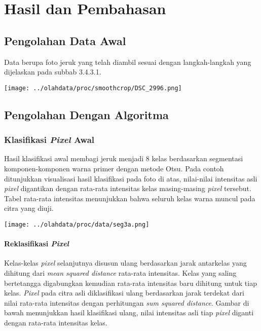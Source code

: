 \documentclass[laporan.tex]{subfiles}
\begin{document}
\chapter{Hasil dan Pembahasan}

\section{Pengolahan Data Awal}

Data berupa foto jeruk yang telah diambil sesuai dengan langkah-langkah yang dijelaskan pada subbab 3.4.3.1.

\texttt{[image: ../olahdata/proc/smoothcrop/DSC\_2996.png]}

\section{Pengolahan Dengan Algoritma}

\subsection{Klasifikasi \emph{Pixel} Awal}

Hasil klasifikasi awal membagi jeruk menjadi 8 kelas berdasarkan segmentasi komponen-komponen warna primer dengan metode Otsu. Pada contoh ditunjukkan visualisasi hasil klasifikasi pada foto di atas, nilai-nilai intensitas asli \emph{pixel} digantikan dengan rata-rata intensitas kelas masing-masing \emph{pixel} tersebut. Tabel rata-rata intensitas menunjukkan bahwa seluruh kelas warna muncul pada citra yang diuji.

\texttt{[image: ../olahdata/proc/data/seg3a.png]}

\subsubsection{Reklasifikasi \emph{Pixel}}

Kelas-kelas \emph{pixel} selanjutnya disusun ulang berdasarkan jarak antarkelas yang dihitung dari \emph{mean squared distance} rata-rata intensitas. Kelas yang saling bertetangga digabungkan kemudian rata-rata intensitas baru dihitung untuk tiap kelas. \emph{Pixel} pada citra asli diklasifikasi ulang berdasarkan jarak terdekat dari nilai rata-rata intensitas dengan perhitungan \emph{sum squared distance}. Gambar di bawah menunjukkan hasil klasifikasi ulang, nilai intensitas asli tiap \emph{pixel} diganti dengan rata-rata intensitas kelas.
\end{document}
